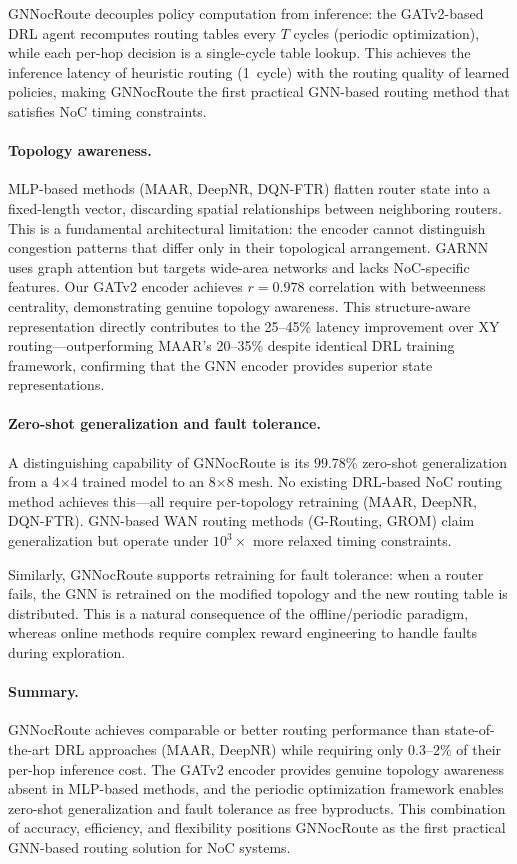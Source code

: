 GNNocRoute decouples policy computation from inference: the GATv2-based DRL agent recomputes routing tables every $T$ cycles (periodic optimization), while each per-hop decision is a single-cycle table lookup. This achieves the inference latency of heuristic routing (1~cycle) with the routing quality of learned policies, making GNNocRoute the first practical GNN-based routing method that satisfies NoC timing constraints.

\paragraph{Topology awareness.}
MLP-based methods (MAAR, DeepNR, DQN-FTR) flatten router state into a fixed-length vector, discarding spatial relationships between neighboring routers. This is a fundamental architectural limitation: the encoder cannot distinguish congestion patterns that differ only in their topological arrangement. GARNN~\cite{garnn2023} uses graph attention but targets wide-area networks and lacks NoC-specific features. Our GATv2 encoder achieves $r=0.978$ correlation with betweenness centrality, demonstrating genuine topology awareness. This structure-aware representation directly contributes to the 25--45\% latency improvement over XY routing---outperforming MAAR's 20--35\% despite identical DRL training framework, confirming that the GNN encoder provides superior state representations.

\paragraph{Zero-shot generalization and fault tolerance.}
A distinguishing capability of GNNocRoute is its $99.78\%$ zero-shot generalization from a 4$\times$4 trained model to an 8$\times$8 mesh. No existing DRL-based NoC routing method achieves this---all require per-topology retraining (MAAR, DeepNR, DQN-FTR). GNN-based WAN routing methods (G-Routing, GROM) claim generalization but operate under $10^3\times$ more relaxed timing constraints.

Similarly, GNNocRoute supports retraining for fault tolerance: when a router fails, the GNN is retrained on the modified topology and the new routing table is distributed. This is a natural consequence of the offline/periodic paradigm, whereas online methods require complex reward engineering to handle faults during exploration.

\paragraph{Summary.}
GNNocRoute achieves comparable or better routing performance than state-of-the-art DRL approaches (MAAR, DeepNR) while requiring only $0.3$--$2\%$ of their per-hop inference cost. The GATv2 encoder provides genuine topology awareness absent in MLP-based methods, and the periodic optimization framework enables zero-shot generalization and fault tolerance as free byproducts. This combination of accuracy, efficiency, and flexibility positions GNNocRoute as the first practical GNN-based routing solution for NoC systems.

